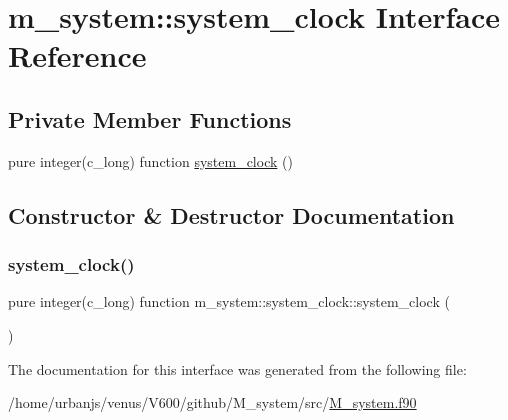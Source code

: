 \hypertarget{interfacem__system_1_1system__clock}{}\section{m\+\_\+system\+:\+:system\+\_\+clock Interface Reference}
\label{interfacem__system_1_1system__clock}
\subsection*{Private Member Functions}
\begin{DoxyCompactItemize}
\item 
pure integer(c\+\_\+long) function \mbox{\hyperlink{interfacem__system_1_1system__clock_a47f99a135515780551f47f412e0a5413}{system\+\_\+clock}} ()
\end{DoxyCompactItemize}


\subsection{Constructor \& Destructor Documentation}
\mbox{\label{interfacem__system_1_1system__clock_a47f99a135515780551f47f412e0a5413}} 
\subsubsection{\texorpdfstring{system\+\_\+clock()}{system\_clock()}}
{\footnotesize\ttfamily pure integer(c\+\_\+long) function m\+\_\+system\+::system\+\_\+clock\+::system\+\_\+clock (\begin{DoxyParamCaption}{ }\end{DoxyParamCaption})\hspace{0.3cm}{\ttfamily [private]}}



The documentation for this interface was generated from the following file\+:\begin{DoxyCompactItemize}
\item 
/home/urbanjs/venus/\+V600/github/\+M\+\_\+system/src/\mbox{\hyperlink{M__system_8f90}{M\+\_\+system.\+f90}}\end{DoxyCompactItemize}
